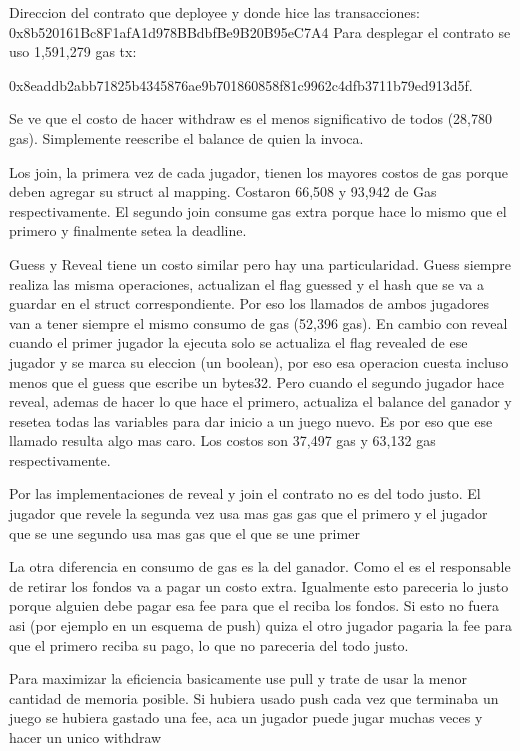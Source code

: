 \documentclass[12pt,addpoints,answers]{exam}
\begin{document}
\begin{questions}
\begin{parts}
\begin{solution} %
  Direccion del contrato que deployee y donde hice las transacciones: 0x8b520161Bc8F1afA1d978BBdbfBe9B20B95eC7A4
  Para desplegar el contrato se uso 1,591,279 gas tx: 
  
  0x8eaddb2abb71825b4345876ae9b701860858f81c9962c4dfb3711b79ed913d5f.

  Se ve que el costo de hacer withdraw es el menos significativo de todos (28,780 gas). 
  Simplemente reescribe el balance de quien la invoca.


  Los join, la primera vez de cada jugador, tienen los mayores costos de gas porque deben agregar su struct al mapping. Costaron 66,508
  y 93,942 de Gas respectivamente. El segundo join consume gas extra porque hace lo mismo que el primero y finalmente setea la
  deadline.  

  Guess y Reveal tiene un costo similar pero hay una particularidad. Guess siempre realiza las misma operaciones, actualizan
  el flag guessed y el hash que se va a guardar en el struct correspondiente. Por eso los llamados de ambos jugadores van
  a tener siempre el mismo consumo de gas (52,396 gas). En cambio con reveal cuando el primer jugador la ejecuta solo se actualiza el
  flag revealed de ese jugador y se marca su eleccion (un boolean), por eso esa operacion cuesta incluso menos que el guess que
  escribe un bytes32. Pero cuando el segundo jugador hace reveal, ademas de hacer lo que hace el primero, actualiza el balance
  del ganador y resetea todas las variables para dar inicio a un juego nuevo. Es por eso que ese llamado resulta algo mas caro.
  Los costos son 37,497 gas y 63,132 gas respectivamente.

  Por las implementaciones de reveal y join el contrato no es del todo justo. El jugador que revele la segunda vez usa mas gas gas que el primero 
  y el jugador que se une segundo usa mas gas que el que se une primer 

  La otra diferencia en consumo de gas es la del ganador. Como el es el responsable de retirar los fondos va a pagar un
  costo extra. Igualmente esto pareceria lo justo porque alguien debe pagar esa fee para que el reciba los fondos. Si esto 
  no fuera asi  (por ejemplo en un esquema de push) quiza el otro jugador pagaria la fee para que el primero reciba su pago,
  lo que no pareceria del todo justo. 

  Para maximizar la eficiencia basicamente use pull y trate de usar la menor cantidad de memoria posible. Si hubiera usado 
  push cada vez que terminaba un juego se hubiera gastado una fee, aca un jugador puede jugar muchas veces y hacer un unico withdraw
      


\end{solution}
\end{parts}
\end{questions}
\end{document}
